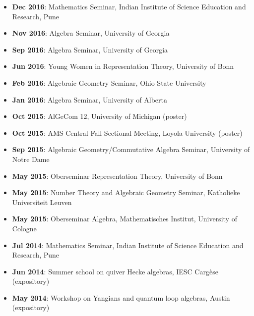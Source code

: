 \documentclass[a4paper]{moderncv}
\begin{document}
\begin{itemize}
\item \textbf{Dec 2016}: Mathematics Seminar, Indian Institute of Science Education and Research, Pune
\item \textbf{Nov 2016}: Algebra Seminar, University of Georgia
\item \textbf{Sep 2016}: Algebra Seminar, University of Georgia
\item \textbf{Jun 2016}: Young Women in Representation Theory, University of Bonn
\item \textbf{Feb 2016}: Algebraic Geometry Seminar, Ohio State University
\item \textbf{Jan 2016}: Algebra Seminar, University of Alberta
\item \textbf{Oct 2015}: AlGeCom 12, University of Michigan (poster)
\item \textbf{Oct 2015}: AMS Central Fall Sectional Meeting, Loyola University (poster)
\item \textbf{Sep 2015}: Algebraic Geometry/Commutative Algebra Seminar, University of Notre Dame
\item \textbf{May 2015}: Oberseminar Representation Theory, University of Bonn
\item \textbf{May 2015}: Number Theory and Algebraic Geometry Seminar, Katholieke Universiteit Leuven
\item \textbf{May 2015}: Oberseminar Algebra, Mathematisches Institut, University of Cologne
\item \textbf{Jul 2014}: Mathematics Seminar, Indian Institute of Science Education and Research, Pune
\item \textbf{Jun 2014}: Summer school on quiver Hecke algebras, IESC Cargèse (expository)
\item \textbf{May 2014}: Workshop on Yangians and quantum loop algebras, Austin (expository)
\end{itemize}
\end{document}
